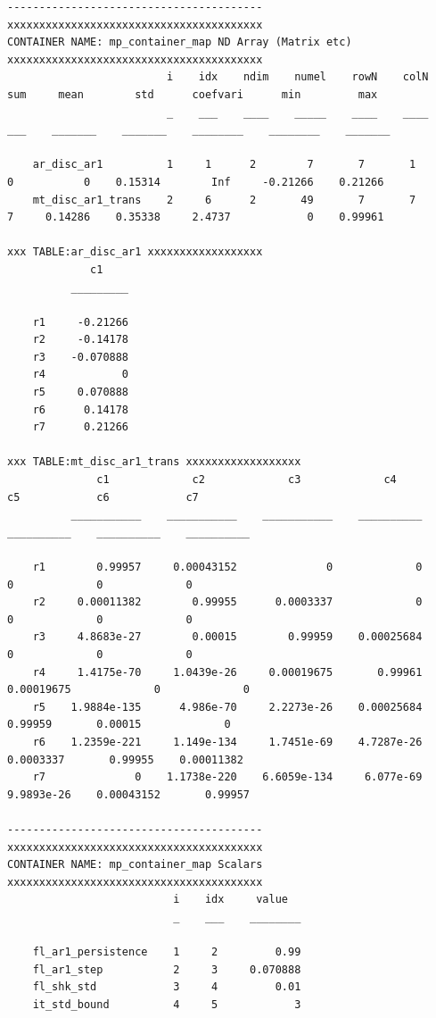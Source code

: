 \documentclass[
]{book}
\begin{document}
\begin{verbatim}
----------------------------------------
xxxxxxxxxxxxxxxxxxxxxxxxxxxxxxxxxxxxxxxx
CONTAINER NAME: mp_container_map ND Array (Matrix etc)
xxxxxxxxxxxxxxxxxxxxxxxxxxxxxxxxxxxxxxxx
                         i    idx    ndim    numel    rowN    colN    sum     mean        std      coefvari      min         max  
                         _    ___    ____    _____    ____    ____    ___    _______    _______    ________    ________    _______

    ar_disc_ar1          1     1      2        7       7       1       0           0    0.15314        Inf     -0.21266    0.21266
    mt_disc_ar1_trans    2     6      2       49       7       7       7     0.14286    0.35338     2.4737            0    0.99961

xxx TABLE:ar_disc_ar1 xxxxxxxxxxxxxxxxxx
             c1    
          _________

    r1     -0.21266
    r2     -0.14178
    r3    -0.070888
    r4            0
    r5     0.070888
    r6      0.14178
    r7      0.21266

xxx TABLE:mt_disc_ar1_trans xxxxxxxxxxxxxxxxxx
              c1             c2             c3             c4            c5            c6            c7    
          ___________    ___________    ___________    __________    __________    __________    __________

    r1        0.99957     0.00043152              0             0             0             0             0
    r2     0.00011382        0.99955      0.0003337             0             0             0             0
    r3     4.8683e-27        0.00015        0.99959    0.00025684             0             0             0
    r4     1.4175e-70     1.0439e-26     0.00019675       0.99961    0.00019675             0             0
    r5    1.9884e-135      4.986e-70     2.2273e-26    0.00025684       0.99959       0.00015             0
    r6    1.2359e-221     1.149e-134     1.7451e-69    4.7287e-26     0.0003337       0.99955    0.00011382
    r7              0    1.1738e-220    6.6059e-134     6.077e-69    9.9893e-26    0.00043152       0.99957

----------------------------------------
xxxxxxxxxxxxxxxxxxxxxxxxxxxxxxxxxxxxxxxx
CONTAINER NAME: mp_container_map Scalars
xxxxxxxxxxxxxxxxxxxxxxxxxxxxxxxxxxxxxxxx
                          i    idx     value  
                          _    ___    ________

    fl_ar1_persistence    1     2         0.99
    fl_ar1_step           2     3     0.070888
    fl_shk_std            3     4         0.01
    it_std_bound          4     5            3


\end{verbatim}
\end{document}
